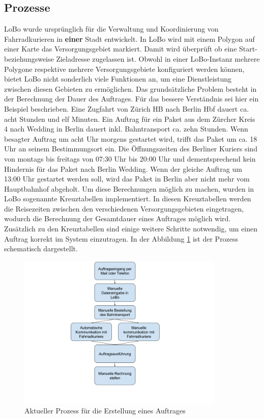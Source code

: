 \subsection{Prozesse}
\label{subsec:prozess}
LoBo wurde ursprünglich für die Verwaltung und Koordinierung von Fahrradkurieren in \textbf{einer} Stadt entwickelt. In LoBo wird mit einem Polygon auf einer Karte das Versorgungsgebiet markiert. Damit wird überprüft ob eine Start- beziehungsweise Zieladresse zugelassen ist. Obwohl in einer LoBo-Instanz mehrere Polygone respektive mehrere Versorgungsgebiete konfiguriert werden können, bietet LoBo nicht sonderlich viele Funktionen an, um eine Dienstleistung zwischen diesen Gebieten zu ermöglichen. Das grundsätzliche Problem besteht in der Berechnung der Dauer des Auftrages. Für das bessere Verständnis sei hier ein Beispiel beschrieben. Eine Zugfahrt von Zürich HB nach Berlin Hbf dauert ca. acht Stunden und elf Minuten. Ein Auftrag für ein Paket aus dem Zürcher Kreis 4 nach Wedding in Berlin dauert inkl. Bahntransport ca. zehn Stunden. Wenn besagter Auftrag um acht Uhr morgens gestartet wird, trifft das Paket um ca. 18 Uhr an seinem Bestimmungsort ein. Die Öffnungszeiten des Berliner Kuriers sind von montags bis freitags von 07:30 Uhr bis 20:00 Uhr und dementsprechend kein Hindernis für das Paket nach Berlin Wedding. Wenn der gleiche Auftrag um 13:00 Uhr gestartet werden soll, wird das Paket in Berlin aber nicht mehr vom Hauptbahnhof abgeholt. Um diese Berechnungen möglich zu machen, wurden in LoBo sogenannte Kreuztabellen implementiert. In diesen Kreuztabellen werden die Reisezeiten zwischen den verschiedenen Versorgungsgebieten eingetragen, wodurch die Berechnung der Gesamtdauer eines Auftrages möglich wird. Zusätzlich zu den Kreuztabellen sind einige weitere Schritte notwendig, um einen Auftrag korrekt im System einzutragen. In der Abbildung \ref{fig1:currentprocess} ist der Prozess schematisch dargestellt.

\begin{figure}[ht]
	\centering
  \includegraphics[width=0.88\textwidth]{images/currentProcess.png}
	\caption{Aktueller Prozess für die Erstellung eines Auftrages}
	\label{fig1:currentprocess}
\end{figure}

